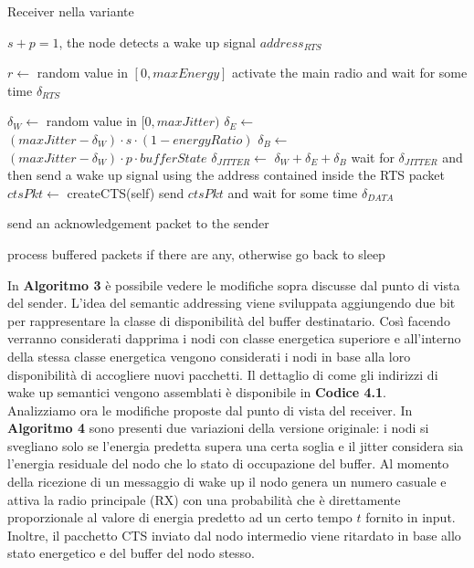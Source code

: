 \documentclass[binding=0.6cm,TFA]{sapthesis}
\begin{document}
\begin{algorithm}[H]
    \caption{Receiver nella variante}
    \begin{algorithmic}
        \REQUIRE $s+p=1$, the node detects a wake up signal $address_{RTS}$

            \STATE $r \leftarrow$ random value in $[0,maxEnergy]$
                \STATE activate the main radio and wait for some time $\delta_{RTS}$


                    \STATE $\delta_{W} \leftarrow$ random value in $[0,maxJitter)$
                    \STATE $\delta_{E} \leftarrow$ $(maxJitter-\delta_{W}) \cdot s \cdot (1 - energyRatio)$
                    \STATE $\delta_{B} \leftarrow$ $(maxJitter-\delta_{W}) \cdot p \cdot bufferState$
                    \STATE $\delta_{JITTER} \leftarrow$ $\delta_{W} + \delta_{E} + \delta_{B}$
                    \STATE wait for $\delta_{JITTER}$ and then send a wake up signal using the address contained inside the RTS packet
                    \STATE $ctsPkt \leftarrow$ createCTS(self)
                    \STATE send $ctsPkt$ and wait for some time $\delta_{DATA}$

                        \STATE send an acknowledgement packet to the sender
                    \ENDIF
                \ENDIF

                \STATE process buffered packets if there are any, otherwise go back to sleep
            \ENDIF
        
    \end{algorithmic}
\end{algorithm}

In \textbf{Algoritmo 3} è possibile vedere le modifiche sopra discusse dal punto di vista del sender. L'idea del semantic addressing viene sviluppata
aggiungendo due bit per rappresentare la classe di disponibilità del buffer destinatario. Così facendo verranno considerati dapprima i nodi con classe
energetica superiore e all'interno della stessa classe energetica vengono considerati i nodi in base alla loro disponibilità di accogliere nuovi
pacchetti. Il dettaglio di come gli indirizzi di wake up semantici vengono assemblati è disponibile in \textbf{Codice 4.1}.\\

Analizziamo ora le modifiche proposte dal punto di vista del receiver. In \textbf{Algoritmo 4} sono presenti due variazioni della versione
originale: i nodi si svegliano solo se l'energia predetta supera una certa soglia e il jitter considera sia l'energia residuale del nodo che lo stato
di occupazione del buffer. Al momento della ricezione di un messaggio di wake up il nodo genera un numero casuale e attiva la radio principale (RX)
con una probabilità che è direttamente proporzionale al valore di energia predetto ad un certo tempo $t$ fornito in input. Inoltre, il pacchetto CTS
inviato dal nodo intermedio viene ritardato in base allo stato energetico e del buffer del nodo stesso.
\end{document}
